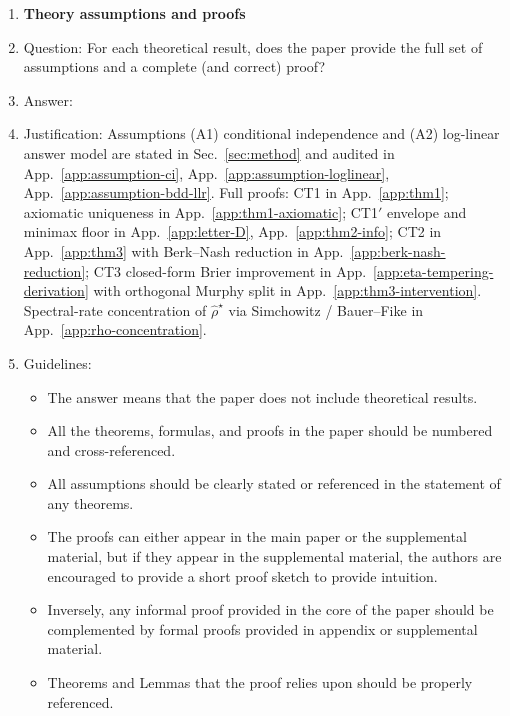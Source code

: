 \begin{enumerate}
\item \textbf{Theory assumptions and proofs}
    \item[] Question: For each theoretical result, does the paper provide the full set of assumptions and a complete (and correct) proof?
    \item[] Answer: \answerYes{}
    \item[] Justification: Assumptions (A1) conditional independence and (A2) log-linear answer model are stated in Sec.~\ref{sec:method} and audited in App.~\ref{app:assumption-ci}, App.~\ref{app:assumption-loglinear}, App.~\ref{app:assumption-bdd-llr}. Full proofs: CT1 in App.~\ref{app:thm1}; axiomatic uniqueness in App.~\ref{app:thm1-axiomatic}; CT1$'$ envelope and minimax floor in App.~\ref{app:letter-D}, App.~\ref{app:thm2-info}; CT2 in App.~\ref{app:thm3} with Berk--Nash reduction in App.~\ref{app:berk-nash-reduction}; CT3 closed-form Brier improvement in App.~\ref{app:eta-tempering-derivation} with orthogonal Murphy split in App.~\ref{app:thm3-intervention}. Spectral-rate concentration of $\widehat\rho^\star$ via Simchowitz / Bauer--Fike in App.~\ref{app:rho-concentration}.
    \item[] Guidelines:
    \begin{itemize}
        \item The answer \answerNA{} means that the paper does not include theoretical results.
        \item All the theorems, formulas, and proofs in the paper should be numbered and cross-referenced.
        \item All assumptions should be clearly stated or referenced in the statement of any theorems.
        \item The proofs can either appear in the main paper or the supplemental material, but if they appear in the supplemental material, the authors are encouraged to provide a short proof sketch to provide intuition.
        \item Inversely, any informal proof provided in the core of the paper should be complemented by formal proofs provided in appendix or supplemental material.
        \item Theorems and Lemmas that the proof relies upon should be properly referenced.
    \end{itemize}


\end{enumerate}
